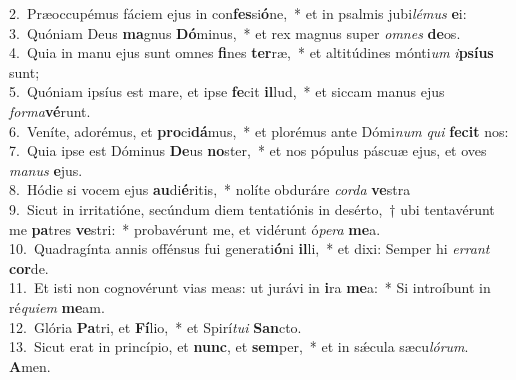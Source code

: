 {2.~}Præoccupémus fáciem ejus in con\textbf{fes}si\textbf{ó}ne,~* et in psalmis jubi\textit{lé}\textit{mus} \textbf{e}i:\\
{3.~}Quóniam Deus \textbf{ma}gnus \textbf{Dó}minus,~* et rex magnus super \textit{om}\textit{nes} \textbf{de}os.\\
{4.~}Quia in manu ejus sunt omnes \textbf{fi}nes \textbf{ter}ræ,~* et altitúdines mónti\textit{um} \textit{i}\textbf{psí}\textbf{us} sunt;\\
{5.~}Quóniam ipsíus est mare, et ipse \textbf{fe}cit \textbf{il}lud,~* et siccam manus ejus \textit{for}\textit{ma}\textbf{vé}runt.\\
{6.~}Veníte, adorémus, et \textbf{pro}ci\textbf{dá}mus,~* et plorémus ante Dómi\textit{num} \textit{qui} \textbf{fe}\textbf{cit} nos:\\
{7.~}Quia ipse est Dóminus \textbf{De}us \textbf{no}ster,~* et nos pópulus páscuæ ejus, et oves \textit{ma}\textit{nus} \textbf{e}jus.\\
{8.~}Hódie si vocem ejus \textbf{au}di\textbf{é}ritis,~* nolíte obduráre \textit{cor}\textit{da} \textbf{ve}stra\\
{9.~}Sicut in irritatióne, secúndum diem tentatiónis in desérto,~† ubi tentavérunt me \textbf{pa}tres \textbf{ve}stri:~* probavérunt me, et vidérunt ó\textit{pe}\textit{ra} \textbf{me}a.\\
{10.~}Quadragínta annis offénsus fui generati\textbf{ó}ni \textbf{il}li,~* et dixi: Semper hi \textit{er}\textit{rant} \textbf{cor}de.\\
{11.~}Et isti non cognovérunt vias meas: ut jurávi in \textbf{i}ra \textbf{me}a:~* Si introíbunt in ré\textit{qui}\textit{em} \textbf{me}am.\\
{12.~}Glória \textbf{Pa}tri, et \textbf{Fí}lio,~* et Spirí\textit{tu}\textit{i} \textbf{San}cto.\\
{13.~}Sicut erat in princípio, et \textbf{nunc}, et \textbf{sem}per,~* et in sǽcula sæcu\textit{ló}\textit{rum}. \textbf{A}men.\\
